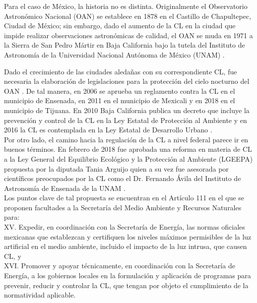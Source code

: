 Para el caso de México, la historia no es distinta. Originalmente el Observatorio Astronómico Nacional (OAN) se establece en 1878 en el Castillo de Chapultepec, Ciudad de México; sin embargo, dado el aumento de la CL en la ciudad que impide realizar observaciones astronómicas de calidad, el OAN se muda en 1971 a la Sierra de San Pedro Mártir en Baja California bajo la tutela del Instituto de Astronomía de la Universidad Nacional Autónoma de México (UNAM) \citep{UNESCO2016}.\\

\newpage

Dado el crecimiento de las ciudades aledañas con su correspondiente CL, fue necesaria la elaboración de legislaciones para la protección del cielo nocturno del OAN \citep{UNESCO2016}. De tal manera, en 2006 se aprueba un reglamento contra la CL en el municipio de Ensenada, en 2011 en el municipio de Mexicali y en 2018 en el municipio de Tijuana. En 2010 Baja California publica un decreto que incluye la prevención y control de la CL en la Ley Estatal de Protección al Ambiente y en 2016 la CL es contemplada en la Ley Estatal de Desarrollo Urbano \citep{UNESCO2016}.\\

Por otro lado, el camino hacia la regulación de la CL a nivel federal parece ir en buenos términos. En febrero de 2018 fue aprobada una reforma en materia de CL a la Ley General del Equilibrio Ecológico y la Protección al Ambiente (LGEEPA) propuesta por  la diputada Tania Arguijo quien a su vez fue asesorada por científicos preocupados por la CL como el Dr. Fernando Ávila del Instituto de Astronomía de Ensenada de la UNAM \citep{Arguijo2018,LGEEPA2018}.\\

Los puntos clave de tal propuesta se encuentran en el Artículo 111 en el que se proponen facultades a la Secretaría del Medio Ambiente y Recursos Naturales para:\\

XV. Expedir, en coordinación con la Secretaría de Energía, las normas oficiales mexicanas que establezcan y certifiquen los niveles máximos permisibles de la luz artificial en el medio ambiente, incluido el impacto de la luz intrusa, que causen CL, y\\

XVI. Promover y apoyar técnicamente, en coordinación con la Secretaría de Energía, a los gobiernos locales en la formulación y aplicación de programas para prevenir, reducir y controlar la CL, que tengan por objeto el cumplimiento de la normatividad aplicable.\\

